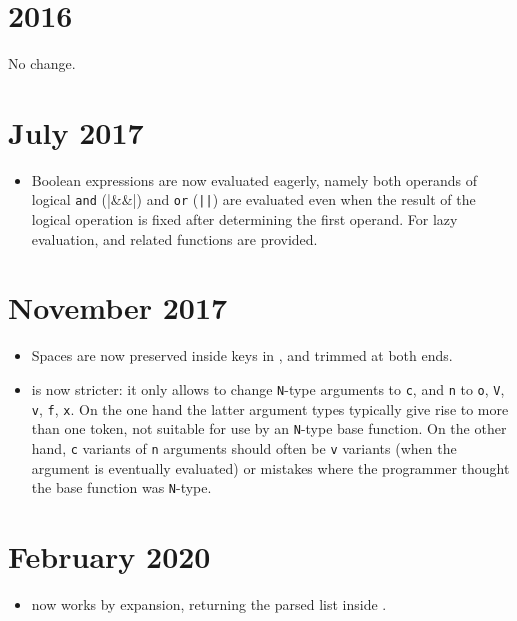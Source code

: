 \documentclass{l3doc}
\begin{document}
\section{2016}

No change.

\section{July 2017}

\begin{itemize}
  \item Boolean expressions are now evaluated eagerly, namely both
    operands of logical \texttt{and} (|&&|) and \texttt{or} (\verb"||")
    are evaluated even when the result of the logical operation is fixed
    after determining the first operand.  For lazy evaluation,
     and related functions are provided.
\end{itemize}

\section{November 2017}

\begin{itemize}
  \item Spaces are now preserved inside keys in , and
    trimmed at both ends.
  \item {} is now stricter: it only allows to
    change \texttt{N}-type arguments to \texttt{c}, and \texttt{n} to
    \texttt{o}, \texttt{V}, \texttt{v}, \texttt{f}, \texttt{x}.  On the
    one hand the latter argument types typically give rise to more than
    one token, not suitable for use by an \texttt{N}-type base function.
    On the other hand, \texttt{c} variants of \texttt{n} arguments
    should often be \texttt{v} variants (when the argument is eventually
    evaluated) or mistakes where the programmer thought the base
    function was \texttt{N}-type.
\end{itemize}

\section{February 2020}

\begin{itemize}
  \item {} now works by expansion, returning
    the parsed list inside .
\end{itemize}
\end{document}
